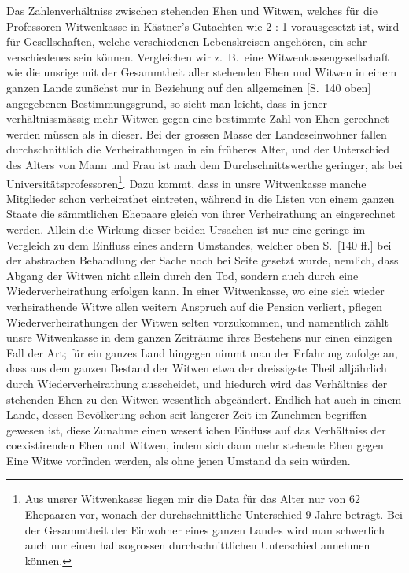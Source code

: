 \documentclass[12pt,a4paper]{article}
\begin{document}
Das Zahlenverh\"altniss zwischen stehenden Ehen und Witwen, welches f\"ur die Professoren-Witwenkasse in K\"astner's Gutachten wie 2 : 1 vorausgesetzt ist, wird f\"ur Gesellschaften, welche verschiedenen Lebenskreisen angeh\"oren, ein sehr verschiedenes sein k\"onnen. Vergleichen wir z.\ B.\ eine Witwenkassengesellschaft wie die unsrige mit der Gesammtheit aller stehenden Ehen und Witwen in einem ganzen Lande zun\"achst nur in Beziehung auf den allgemeinen [S.\ 140 oben] angegebenen Bestimmungsgrund, so sieht man leicht, dass in jener verh\"altnissm\"assig mehr Witwen gegen eine bestimmte Zahl von Ehen gerechnet werden m\"ussen als in dieser. Bei der grossen Masse der Landeseinwohner fallen durchschnittlich die Verheirathungen in ein fr\"uheres Alter, und der Unterschied des Alters von Mann und Frau ist nach dem Durchschnittswerthe geringer, als bei Universit\"atsprofessoren\footnote{Aus unsrer Witwenkasse liegen mir die Data f\"ur das Alter nur von 62 Ehepaaren vor, wonach der durchschnittliche Unterschied 9 Jahre betr\"agt. Bei der Gesammtheit der Einwohner eines ganzen Landes wird man schwerlich auch nur einen halbsogrossen durchschnittlichen Unterschied annehmen k\"onnen.}. Dazu kommt, dass in unsre Witwenkasse manche Mitglieder schon verheirathet eintreten, w\"ahrend in die Listen von einem ganzen Staate die s\"ammtlichen Ehepaare gleich von ihrer Verheirathung an eingerechnet werden. Allein die Wirkung dieser beiden Ursachen ist nur eine geringe im Vergleich zu dem Einfluss eines andern Umstandes, welcher oben S.\ [140 ff.] bei der abstracten Behandlung der Sache noch bei Seite gesetzt wurde, nemlich, dass Abgang der Witwen nicht allein durch den Tod, sondern auch durch eine Wiederverheirathung erfolgen kann. In einer Witwenkasse, wo eine sich wieder verheirathende Witwe allen weitern Anspruch auf die Pension verliert, pflegen Wiederverheirathungen der Witwen selten vorzukommen, und namentlich z\"ahlt unsre Witwenkasse in dem ganzen Zeitr\"aume ihres Bestehens nur einen einzigen Fall der Art; f\"ur ein ganzes Land hingegen nimmt man der Erfahrung zufolge an, dass aus dem ganzen Bestand der Witwen etwa der dreissigste Theil allj\"ahrlich durch Wiederverheirathung ausscheidet, und hiedurch wird das Verh\"altniss der stehenden Ehen zu den Witwen wesentlich abge\"andert. Endlich hat auch in einem Lande, dessen Bev\"olkerung schon seit l\"angerer Zeit im Zunehmen begriffen gewesen ist, diese Zunahme einen wesentlichen Einfluss auf das Verh\"altniss der coexistirenden Ehen und Witwen, indem sich dann mehr stehende Ehen gegen Eine Witwe vorfinden werden, als ohne jenen Umstand da sein w\"urden.
\end{document}
